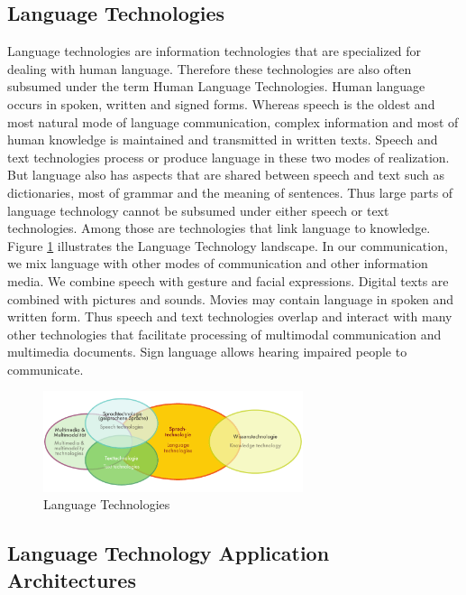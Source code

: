 \begin{multicols}{2}

\subsection{Language Technologies}
Language technologies are information technologies that are
specialized for dealing with human language. Therefore these
technologies are also often subsumed under the term Human Language
Technologies. Human language occurs in spoken, written and signed
forms. Whereas speech is the oldest and most natural mode of language
communication, complex information and most of human knowledge is
maintained and transmitted in written texts. Speech and text
technologies process or produce language in these two modes of
realization. But language also has aspects that are shared between
speech and text such as dictionaries, most of grammar and the meaning
of sentences. Thus large parts of language technology cannot be
subsumed under either speech or text technologies. Among those are
technologies that link language to knowledge. Figure \ref{fig:languagetechnoEng} 
illustrates the Language Technology landscape. In our communication,
we mix language with other modes of communication and other
information media. We combine speech with gesture and facial
expressions. Digital texts are combined with pictures and
sounds. Movies may contain language in spoken and written form. Thus
speech and text technologies overlap and interact with many other
technologies that facilitate processing of multimodal communication
and multimedia documents. Sign language allows hearing impaired people to communicate.

\begin{figure}
\begin{center}
 \includegraphics[width=3.0in]{../_media/language_technologies} 
\caption{Language Technologies}
\label{fig:languagetechnoEng}
\end{center}
\end{figure}

\subsection{Language Technology Application Architectures}


\end{multicols}
